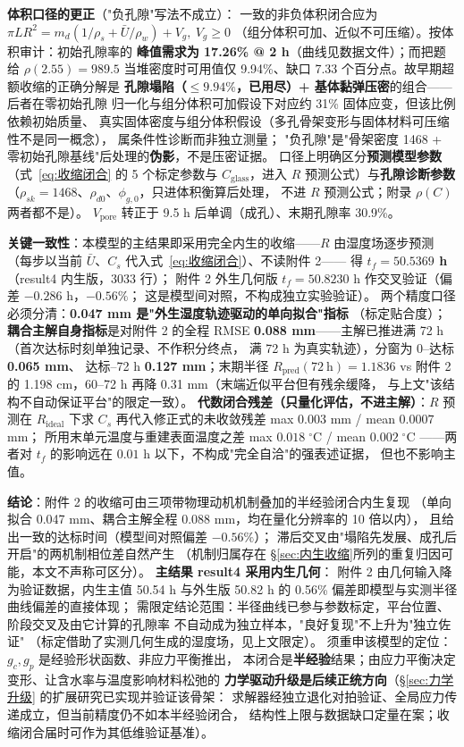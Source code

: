 \documentclass[12pt,a4paper]{ctexart}
\numberwithin{equation}{section}
\begin{document}
\textbf{体积口径的更正}（"负孔隙"写法不成立）：
一致的非负体积闭合应为 $\pi L R^2=m_d(1/\rho_s+\bar U/\rho_w)+V_g,\ V_g\ge0$
（组分体积可加、近似不可压缩）。按体积审计：初始孔隙率的
\textbf{峰值需求为 17.26\% @ 2 h}（曲线见数据文件）；而把题给 $\rho(2.55)=989.5$
当堆密度时可用值仅 9.94\%、缺口 7.33 个百分点。故早期超额收缩的正确分解是
\textbf{孔隙塌陷（$\le9.94\%$，已用尽）+ 基体黏弹压密}的组合——后者在零初始孔隙
归一化与组分体积可加假设下对应约 31\% 固体应变，但该比例依赖初始质量、
真实固体密度与组分体积假设（多孔骨架变形与固体材料可压缩性不是同一概念），
属条件性诊断而非独立测量；
"负孔隙"是"骨架密度 1468 + 零初始孔隙基线"后处理的\textbf{伪影}，不是压密证据。
口径上明确区分\textbf{预测模型参数}（式~\eqref{eq:收缩闭合} 的 5 个标定参数与
$C_{\mathrm{glass}}$，进入 $R$ 预测公式）与\textbf{孔隙诊断参数}
（$\rho_{sk}=1468$、$\rho_{d0}$、$\phi_{g,0}$，只进体积衡算后处理，
不进 $R$ 预测公式；附录 $\rho(C)$ 两者都不是）。
$V_{\mathrm{pore}}$ 转正于 9.5 h 后单调（成孔）、末期孔隙率 30.9\%。

\textbf{关键一致性}：本模型的主结果即采用完全内生的收缩——$R$ 由湿度场逐步预测
（每步以当前 $\bar U$、$C_s$ 代入式~\eqref{eq:收缩闭合}）、不读附件 2——
得 \textbf{$t_f=50.5369$ h}（result4 内生版，3033 行）；
附件 2 外生几何版 $t_f=50.8230$ h 作交叉验证（偏差 $-0.286$ h，$-0.56\%$；
这是模型间对照，不构成独立实验验证）。
两个精度口径必须分清：\textbf{0.047 mm 是"外生湿度轨迹驱动的单向拟合"指标}
（标定贴合度）；\textbf{耦合主解自身指标}是对附件 2 的全程 RMSE
\textbf{0.088 mm}——主解已推进满 72 h（首次达标时刻单独记录、不作积分终点，
满 72 h 为真实轨迹），分窗为 0--达标 \textbf{0.065 mm}、
达标--72 h \textbf{0.127 mm}；末期半径 $R_{\mathrm{pred}}(72\ \mathrm h)=1.1836$
vs 附件 2 的 1.198 cm，60--72 h 再降 0.31 mm（末端近似平台但有残余缓降，
与上文"该结构不自动保证平台"的限定一致）。
\textbf{代数闭合残差（只量化评估，不进主解）}：$R$ 预测在 $R_{\mathrm{ideal}}$
下求 $C_s$ 再代入修正式的未收敛残差 max $0.003$ mm / mean $0.0007$ mm；
所用末单元温度与重建表面温度之差 max $0.018\;^\circ$C / mean $0.002\;^\circ$C
——两者对 $t_f$ 的影响远在 $0.01$ h 以下，不构成"完全自洽"的强表述证据，
但也不影响主值。

\textbf{结论}：附件 2 的收缩可由三项带物理动机机制叠加的半经验闭合内生复现
（单向拟合 0.047 mm、耦合主解全程 0.088 mm，均在量化分辨率的 10 倍以内），
且给出一致的达标时间（模型间对照偏差 $-0.56\%$）；
滞后交叉由"塌陷先发展、成孔后开启"的两机制相位差自然产生
（机制归属存在 §\ref{sec:内生收缩}所列的重复归因可能，本文不声称可区分）。
\textbf{主结果 result4 采用内生几何}：
附件 2 由几何输入降为验证数据，内生主值 50.54 h 与外生版 50.82 h 的
0.56\% 偏差即模型与实测半径曲线偏差的直接体现；
需限定结论范围：半径曲线已参与参数标定，平台位置、阶段交叉及由它计算的孔隙率
不自动成为独立样本，"良好复现"不上升为"独立佐证"
（标定借助了实测几何生成的湿度场，见上文限定）。
须重申该模型的定位：$g_c,g_p$ 是经验形状函数、非应力平衡推出，
本闭合是\textbf{半经验}结果；由应力平衡决定变形、让含水率与温度影响材料松弛的
\textbf{力学驱动升级是后续正统方向}（\S\ref{sec:力学升级} 的扩展研究已实现并验证该骨架：
求解器经独立退化对拍验证、全局应力传递成立，但当前精度仍不如本半经验闭合，
结构性上限与数据缺口定量在案；收缩闭合届时可作为其低维验证基准）。
\end{document}
